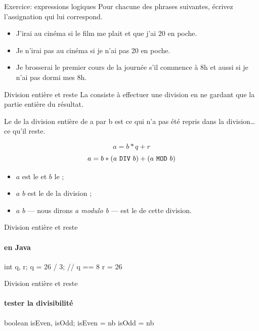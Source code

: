 \begin{hideedit}
\begin{frame}{Exercice: expressions logiques}
  Pour chacune des phrases suivantes,
  écrivez l’assignation qui lui correspond.
  \begin{itemize}[<+->]
    \item J’irai au cinéma si le film me plait et que 
      j’ai 20\texteuro{} en poche.
    \item Je n’irai pas au cinéma si je n’ai pas 
      20\texteuro{} en poche.
    \item Je brosserai le premier cours de la journée 
      s’il commence à 8h et aussi si je n’ai pas dormi mes 8h.
  \end{itemize}
\end{frame}

\begin{frame}[fragile]{Division entière et reste}
  La  consiste à effectuer une division
  en ne gardant que la partie entière du résultat.

  Le  de la division entière de a par b
  est ce qui n’a pas été repris dans la division\dots ce qu'il reste. 

  \[ a = b * q + r\]
  \[ a = b * (a ~\texttt{DIV}~ b) + (a ~\texttt{MOD}~ b)\]

  \begin{itemize}
    \item \(a\) est le  et \(b\) le ;
    \item $a$  $b$ est le  de la division ;
    \item $a$  $b$ --- nous dirons \textit{a modulo b} ---
      est le  de cette division.
  \end{itemize}
\end{frame}

\begin{frame}[fragile]{Division entière et reste}
  \framesubtitle{en Java}
  \begin{java}
int q, r;
q = 26 / 3;  // q == 8
r = 26 %
  \end{java}
\end{frame}

\begin{frame}[fragile]{Division entière et reste}
\framesubtitle{tester la divisibilité}
  \begin{java}
boolean isEven, isOdd;
isEven = nb %
isOdd = nb %
  \end{java}
\end{frame}


\end{hideedit}
